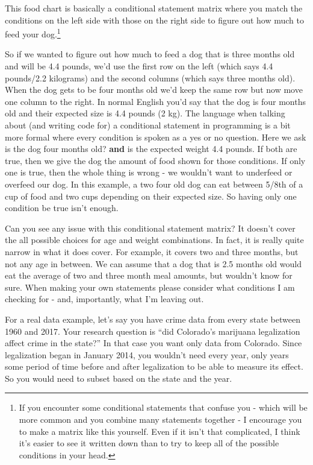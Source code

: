 \documentclass[
  12pt,
  openany]{book}
\begin{document}
This food chart is basically a conditional statement matrix where you match the conditions on the left side with those on the right side to figure out how much to feed your dog.\footnote{If you encounter some conditional statements that confuse you - which will be more common and you combine many statements together - I encourage you to make a matrix like this yourself. Even if it isn't that complicated, I think it's easier to see it written down than to try to keep all of the possible conditions in your head.}

So if we wanted to figure out how much to feed a dog that is three months old and will be 4.4 pounds, we'd use the first row on the left (which says 4.4 pounds/2.2 kilograms) and the second columns (which says three months old). When the dog gets to be four months old we'd keep the same row but now move one column to the right. In normal English you'd say that the dog is four months old and their expected size is 4.4 pounds (2 kg). The language when talking about (and writing code for) a conditional statement in programming is a bit more formal where every condition is spoken as a yes or no question. Here we ask is the dog four months old? \textbf{and} is the expected weight 4.4 pounds. If both are true, then we give the dog the amount of food shown for those conditions. If only one is true, then the whole thing is wrong - we wouldn't want to underfeed or overfeed our dog. In this example, a two four old dog can eat between 5/8th of a cup of food and two cups depending on their expected size. So having only one condition be true isn't enough.

Can you see any issue with this conditional statement matrix? It doesn't cover the all possible choices for age and weight combinations. In fact, it is really quite narrow in what it does cover. For example, it covers two and three months, but not any age in between. We can assume that a dog that is 2.5 months old would eat the average of two and three month meal amounts, but wouldn't know for sure. When making your own statements please consider what conditions I am checking for - and, importantly, what I'm leaving out.

For a real data example, let's say you have crime data from every state between 1960 and 2017. Your research question is ``did Colorado's marijuana legalization affect crime in the state?'' In that case you want only data from Colorado. Since legalization began in January 2014, you wouldn't need every year, only years some period of time before and after legalization to be able to measure its effect. So you would need to subset based on the state and the year.
\end{document}
